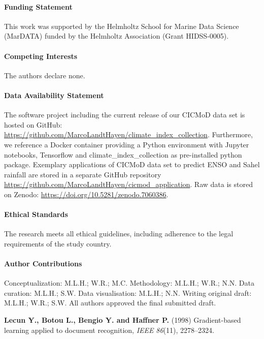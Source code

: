 \documentclass{CUP-JNL-DTM}%
\theoremstyle{definition}
\numberwithin{equation}{section}
\begin{document}
\begin{Backmatter}

\paragraph{Funding Statement}
This work was supported by the Helmholtz School for Marine Data Science (MarDATA) funded by the Helmholtz Association (Grant HIDSS-0005).

\paragraph{Competing Interests}
The authors declare none.

\paragraph{Data Availability Statement}
The software project including the current release of our CICMoD data set is hosted on GitHub: \url{https://github.com/MarcoLandtHayen/climate_index_collection}. Furthermore, we reference a Docker container providing a Python environment with Jupyter notebooks, Tensorflow and climate\_index\_collection as pre-installed python package. Exemplary applications of CICMoD data set to predict ENSO and Sahel rainfall are stored in a separate GitHub repository \url{https://github.com/MarcoLandtHayen/cicmod_application}. Raw data is stored on Zenodo: \url{https://doi.org/10.5281/zenodo.7060386}.

\paragraph{Ethical Standards}
The research meets all ethical guidelines, including adherence to the legal requirements of the study country.

\paragraph{Author Contributions}
Conceptualization: M.L.H.; W.R.; M.C. Methodology: M.L.H.; W.R.; N.N. Data curation: M.L.H.; S.W. Data visualisation: M.L.H.; N.N. Writing original draft: M.L.H.; W.R.; S.W. All authors approved the final submitted draft.

\begin{thebibliography}{}
\textbf{Lecun Y., Botou L., Bengio Y. and Haffner P.} (1998) Gradient-based learning applied to document recognition, \textit{IEEE} \textit{86}(11), {2278}--{2324}.


\end{thebibliography}
\end{Backmatter}
\end{document}
